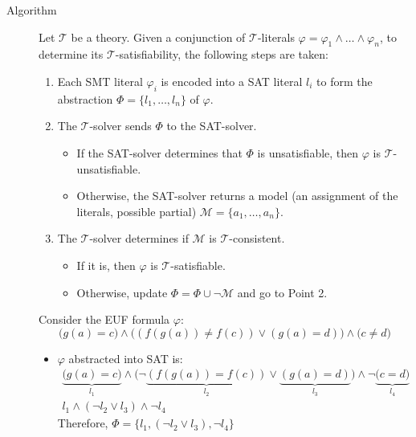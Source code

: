 \begin{description}
    \item[Algorithm] \phantom{}
        Let $\mathcal{T}$ be a theory.
        Given a conjunction of $\mathcal{T}$-literals $\varphi = \varphi_1 \land \dots \land \varphi_n$, 
        to determine its $\mathcal{T}$-satisfiability, the following steps are taken:
        \begin{enumerate}
            \item Each SMT literal $\varphi_i$ is encoded into a SAT literal $l_i$ to form the abstraction $\Phi = \{ l_1, \dots, l_n \} $ of $\varphi$.
            \item The $\mathcal{T}$-solver sends $\Phi$ to the SAT-solver.
                \begin{itemize}
                    \item If the SAT-solver determines that $\Phi$ is unsatisfiable, then $\varphi$ is $\mathcal{T}$-unsatisfiable.
                    \item Otherwise, the SAT-solver returns a model (an assignment of the literals, possible partial) $\mathcal{M} = \{ a_1, \dots, a_n \}$.
                \end{itemize}
            \item The $\mathcal{T}$-solver determines if $\mathcal{M}$ is $\mathcal{T}$-consistent.
                \begin{itemize}
                    \item If it is, then $\varphi$ is $\mathcal{T}$-satisfiable.
                    \item Otherwise, update $\Phi = \Phi \cup \lnot \mathcal{M}$ and go to Point 2.
                \end{itemize}
        \end{enumerate}

        \begin{example}
            Consider the EUF formula $\varphi$:
            \[ \big( g(a) = c \big) \land \big( (f(g(a)) \neq f(c)) \vee (g(a) = d) \big) \land \big( c \neq d \big) \]
            
            \begin{itemize}
                \item $\varphi$ abstracted into SAT is:
                    \begin{gather*}
                        \underbrace{ \big( g(a) = c \big) }_{l_1} \land 
                        \big(
                            \lnot\underbrace{ (f(g(a)) = f(c)) }_{l_2} \vee 
                            \underbrace{ (g(a) = d) }_{l_3}
                        \big) \land 
                        \lnot\underbrace{ \big( c = d \big) }_{l_4} \\
                        l_1 \land (\lnot l_2 \vee l_3) \land \lnot l_4
                    \end{gather*}
                    Therefore, $\Phi = \{ l_1, (\lnot l_2 \vee l_3), \lnot l_4 \}$


\end{itemize}
\end{example}
\end{description}
